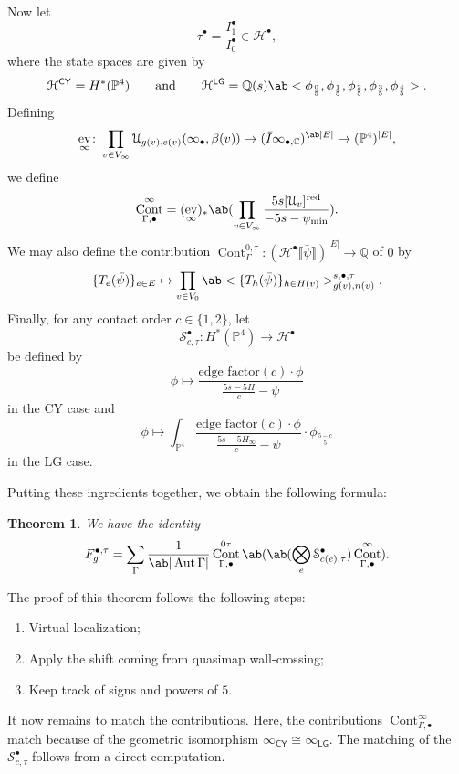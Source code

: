 \documentclass[10pt,oldfontcommands,oneside]{memoir}
\newtheorem{thm}{Theorem}[section]
\theoremstyle{definition}
\theoremstyle{remark}
\theoremstyle{plain}
\theoremstyle{definition}
\theoremstyle{remark}
\newcommand{\C}{\mathbb{C}}
\newcommand{\Q}{\mathbb{Q}}
\renewcommand{\P}{\mathbb{P}}
\newcommand{\mc}[1]{\mathcal{#1}}
\newcommand{\mr}[1]{\mathrm{#1}}
\newcommand{\ms}[1]{\mathsf{#1}}
\newcommand{\1}{\mathbf{1}}
\newcommand{\2}{\mathbf{2}}
\newcommand{\3}{\mathbf{3}}
\newcommand{\red}{\mr{red}}
\newcommand{\ps}[1]{\llbracket #1 \rrbracket}
\newcommand{\LG}{\ms{LG}}
\newcommand{\CY}{\ms{CY}}
\DeclareMathOperator{\Aut}{Aut}
\DeclareMathOperator{\ev}{ev}
\DeclareMathOperator{\Cont}{Cont}
\begin{document}
Now let
\[ \tau^{\bullet} = \frac{I_1^{\bullet}}{I_0^{\bullet}} \in \mc{H}^{\bullet}, \]
where the state spaces are given by
\[ \mc{H}^{\CY} = H^*(\P^4) \qquad \text{and} \qquad \mc{H}^{\LG} = \Q(s) \ab<\phi_{\frac{0}{5}},\phi_{\frac{1}{5}},\phi_{\frac{2}{5}},\phi_{ \frac{3}{5} },\phi_{\frac{4}{5}}>. \]
Defining
\[ \ev_{\infty} \colon \prod_{v \in V_{\infty}} \mc{U}_{g(v), e(v)}(\infty_{\bullet}, \beta(v)) \to (\bar{I}\infty_{\bullet,\C})^{\ab|E|} \to (\P^4)^{|E|}, \]
we define
\[ \Cont_{\Gamma,\bullet}^{\infty} = ( \ev_{\infty} )_* \ab(\prod_{v \in V_{\infty}} \frac{5s[\mc{U}_v]^{\red}}{-5s-\psi_{\min}}). \]
We may also define the contribution $\Cont_{\Gamma}^{0,\tau} \colon (\mc{H}^{\bullet}\ps{\bar{\psi}})^{|E|} \to \Q$ of $0$ by
\[ \{T_e(\bar{\psi})\}_{e \in E} \mapsto \prod_{v \in V_0} \ab<\{T_h(\bar{\psi})\}_{h \in H(v)}>^{s,\bullet,\tau}_{g(v), n(v)}. \]
Finally, for any contact order $c \in \{1,2\}$, let
\[ \mc{S}_{c,\tau}^{\bullet} \colon H^*(\P^4) \to \mc{H}^{\bullet} \]
be defined by
\[ \phi \mapsto \frac{\text{edge factor}(c)\cdot \phi}{\frac{ 5s-5H }{c}-\psi} \]
in the CY case and
\[ \phi \mapsto \int_{\P^4} \frac{\text{edge factor}(c) \cdot \phi}{\frac{ 5s-5H_{\infty} }{c}-\psi} \cdot \phi_{\frac{5-c}{5}} \]
in the LG case.

Putting these ingredients together, we obtain the following formula:
\begin{thm}
    We have the identity
    \begin{align*}
        F_g^{\bullet,\tau} = \sum_{\Gamma} \frac{1}{\ab|\Aut \Gamma|} \Cont_{\Gamma,\bullet}^{0\tau} \ab(\ab(\bigotimes_e \mc{S}_{c(e),\tau}^{\bullet}) \Cont_{\Gamma,\bullet}^{\infty}).
    \end{align*}
\end{thm}

The proof of this theorem follows the following steps:
\begin{enumerate}
    \item Virtual localization;
    \item Apply the shift coming from quasimap wall-crossing;
    \item Keep track of signs and powers of $5$.
\end{enumerate}

It now remains to match the contributions. Here, the contributions $\Cont_{\Gamma,\bullet}^{\infty}$ match because of the geometric isomorphism $\infty_{\CY} \cong \infty_{\LG}$. The matching of the $\mc{S}_{c,\tau}^{\bullet}$ follows from a direct computation.
\end{document}
